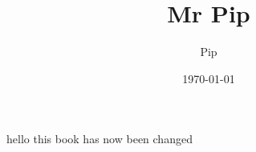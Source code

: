 \documentclass{article}%
\title{Mr Pip}%
\author{Pip}%
\date{\today}%
\begin{document}
%
\normalsize%
\newline%
%
 hello this book has now been changed%
\end{document}
